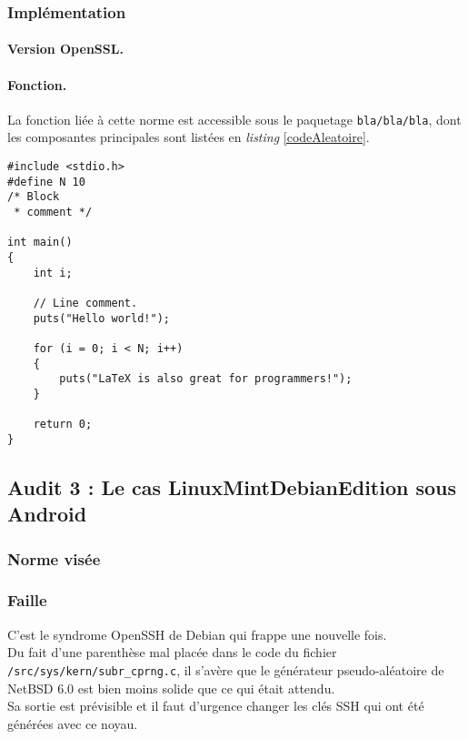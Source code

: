 		
		\subsubsection{Implémentation}
			
			\paragraph{Version OpenSSL.\\}
			
			\paragraph{Fonction.\\}
			La fonction liée à cette norme est accessible sous le paquetage \texttt{bla/bla/bla}, 
			dont les composantes principales sont listées en \textit{listing} \ref{codeAleatoire}.
		
		
			\begin{lstlisting}[style=customc,caption=codeAleatoire.c, label=codeAleatoire]
#include <stdio.h>
#define N 10
/* Block
 * comment */
 
int main()
{
    int i;
 
    // Line comment.
    puts("Hello world!");
 
    for (i = 0; i < N; i++)
    {
        puts("LaTeX is also great for programmers!");
    }
 
    return 0;
}
		\end{lstlisting}
		
	\subsection{Audit 3 : Le cas LinuxMintDebianEdition sous Android}
	\subsubsection{Norme visée}
	\subsubsection{Faille}
	
	C'est le syndrome OpenSSH de Debian qui frappe une nouvelle fois.\\
	Du fait d'une parenthèse mal placée dans le code du fichier 
	\texttt{/src/sys/kern/subr\_cprng.c}, il s'avère que le 
	générateur pseudo-aléatoire de NetBSD 6.0 est bien moins 
	solide que ce qui était attendu.\\
	Sa sortie est prévisible et il faut d'urgence changer les clés SSH qui ont été générées avec ce noyau.\\
	
